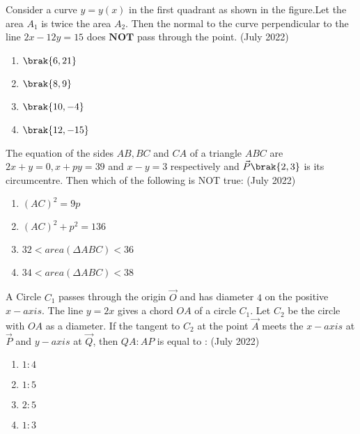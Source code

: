     \item Consider a curve $y=y(x)$ in the first quadrant as shown in the figure.Let the area $A_1$ is twice the area $A_2$. Then the normal to the curve perpendicular to the line $2x-12y=15$ does $\textbf{NOT}$ pass through the point.
    \hfill(July 2022)
	    \\\begin{center}
		     

	    \end{center}
    \begin{enumerate}
        \item $\brak{6,21}$
        \item $\brak{8,9}$
        \item $\brak{10,-4}$
        \item $\brak{12,-15}$
    \end{enumerate}


    \item The equation of the sides $AB, BC$ and $CA$ of a triangle $ABC$ are $2x+y=0 , x+py=39 $ and $x-y=3$ respectively and $\vec{P}\brak{2,3}$ is its circumcentre. Then which of the following is NOT true:
    \hfill(July 2022)
    \begin{enumerate}
        \item $(AC)^2 =9p$
        \item $(AC)^2 + p^2 = 136$
        \item $32 < area(\Delta ABC) <36$
        \item $34 < area(\Delta ABC) <38$
    \end{enumerate}
    
    
    \item A Circle $C_{1}$ passes through the origin $\vec{O}$ and has diameter $4$ on the positive $x-axis.$ The line $y=2x$ gives a chord $OA$ of a circle $C_{1}.$ Let $C_{2}$ be the circle with $OA$ as a diameter. If the tangent to $C_{2}$  at the point $\vec{A}$ meets the $x-axis$ at $\vec{P}$ and $y-axis$ at $\vec{Q}$, then $QA : AP$ is equal to :
    \hfill(July 2022)
    \begin{enumerate}
        \item $1:4$
        \item $1:5$
        \item $2:5$
        \item $1:3$
    \end{enumerate}


